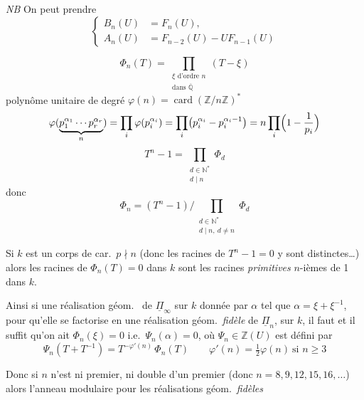 \documentclass[11pt,a4paper]{article}
\begin{document}
\emph{NB} On peut prendre
\[
  \left\{
  \begin{aligned}
    B_n(U) &= F_n(U),\\
    A_n(U) &= F_{n-2}(U) - U F_{n-1}(U)
  \end{aligned}
  \right.
\]

\[
  \Phi_n(T) = \prod_{\substack{\xi \text{ d'ordre } n\\ \text{dans } \overline{\mathbb{Q}}}} (T - \xi)
\]
polynôme  unitaire de degré $\varphi(n) = \operatorname{card}(\mathbb{Z}/n\mathbb{Z})^*$
\[
  \varphi(\underbrace{p_1^{\alpha_1} \cdots p_r^{\alpha_r}}_{n}) = \prod_i \varphi(p_i^{\alpha_i}) = \prod_i \bigl(p_i^{\alpha_i} - p_i^{\alpha_i - 1}\bigr) = n \prod_i \Bigl(1 - \frac{1}{p_i}\Bigr)
\]
\[
  T^n - 1 = \prod_{\substack{d \in \mathbb{N}^*\\ d \mid n}} \Phi_d
\]
donc
\[
  \Phi_n = (T^n - 1) \Big/ \prod_{\substack{d \in \mathbb{N}^*\\ d \mid n,\ d \neq n}} \Phi_d
\]

Si $k$ est un corps de car.\ $p \nmid n$ (donc les racines de $T^n - 1 = 0$ y sont distinctes…) alors les racines de $\Phi_n(T) = 0$ dans $k$ sont les racines \emph{primitives} $n$-ièmes de 1 dans $k$.

Ainsi si \struck{\ill{}}  une réalisation géom.\  de $\underline{\Pi}_\infty$ sur $k$ donnée par $\alpha$ tel que $\alpha = \xi + \xi^{-1}$, pour qu'elle se factorise en une réalisation géom.\ \emph{fidèle} de $\underline{\Pi}_n$, sur $k$,  il faut et il suffit qu'on ait $\Phi_n(\xi) = 0$ i.e.\ $\Psi_n(\alpha) = 0$, où $\Psi_n \in \mathbb{Z}(U)$ est défini par
\[
  \Psi_n(T + T^{-1}) = T^{-\varphi'(n)}\, \Phi_n(T) \qquad \varphi'(n) = \tfrac{1}{2}\varphi(n) \ \text{si } n \geq 3
\]

Donc si $n$  n'est ni premier, ni double d'un \struck{\ill{}}  premier (donc $n = 8, 9, 12, 15, 16, \ldots$) alors l'anneau modulaire pour les réalisations géom.\ \emph{fidèles}
\end{document}
